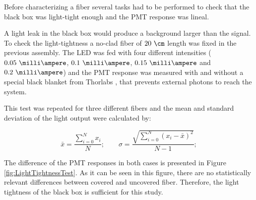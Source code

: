 
Before characterizing a fiber several tasks had to be performed to check that the black box was light-tight enough and the PMT response was lineal.


A light leak in the black box would produce a background larger than the signal. To check the light-tightness a no-clad fiber of $20~\cm$ length was fixed in the previous assembly. The LED was fed with four different intensities ($0.05~\milli\ampere$, $0.1~\milli\ampere$, $0.15~\milli\ampere$ and $0.2~\milli\ampere$) and the PMT response was measured with and without a special black blanket from Thorlabs \cite{BlackBlancket}, that prevents external photons to reach the system. 

This test was repeated for three different fibers and the mean and standard deviation of the light output were calculated by:

\begin{equation}
\bar{x}=\frac{\sum_{i=0}^{N}x_i}{N}; \qquad \sigma = \frac{\sqrt{\sum_{i=0}^{N}(x_i-\bar{x})^2}}{N-1};
\label{eq:MeanAndStandardDesviation}
\end{equation}

The difference of the PMT responses in both cases is presented in Figure \ref{fig:LightTightnessTest}. As it can be seen in this figure, there are no statistically relevant differences between covered and uncovered fiber. Therefore, the light tightness of the black box is sufficient for this study.



